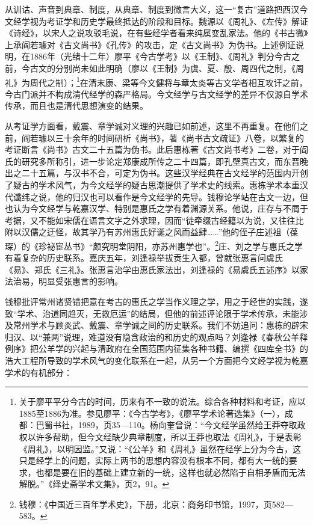\documentclass[a4paper, 12pt, openright]{ctexbook}
\begin{document}
从训诂、声音到典章、制度，从典章、制度到微言大义，这一“复古”道路把西汉今文经学视为考证学和历史学最终抵达的阶段和目标。魏源以《周礼》、《左传》解证《诗经》，以宋人之说攻驳毛说，在有些经学者看来纯属变乱家法。他的《书古微》上承阎若璩对《古文尚书》《孔传》的攻击，定《古文尚书》为伪书。上述例证说明，在1886年（光绪十二年）廖平《今古学考》以《王制》、《周礼》判分今古之前，今古文的分别尚未如此明确（廖以《王制》为虞、夏、殷、周四代之制，《周礼》为周代之制）；\footnote{关于廖平平分今古的时间，历来有不一致的说法。综合各种材料和考证，应以1885至1886为准。参见廖平：《今古学考》，《廖平学术论著选集》（一），成都：巴蜀书社，1989，页35—110。杨向奎曾说：“今文经学虽然给王莽夺取政权以许多帮助，但今文经缺少典章制度，所以王莽也取法《周礼》，于是表彰《周礼》，以明因监。”又说：“《公羊》和《周礼》虽然在经学上分为今古，这只是经学上的问题，实际上两书的思想内容没有根本不同，都有大一统的要求，也都是要在旧的基础上建立新的一统，这样也就必然陷于自相矛盾而无法解脱。”《绎史斋学术文集》，页2，91。}在清末康、梁等今文健将与章太炎等古文学者相互攻讦之前，今古门派并不构成清代经学的森严格局。今文经学与古文经学的差异不仅源自学术传承，而且也是清代思想演变的结果。

从考证学方面看，戴震、章学诚对义理的兴趣已如前述，这里不再重复。在他们之前，阎若璩以三十余年的时间研析《尚书》，著《尚书古文疏证》八卷，以繁复的考证断言《尚书》古文二十五篇为伪书。此后惠栋著《古文尚书考》二卷，对于阎氏的研究多所称引，进一步论定郑康成所传之二十四篇，即孔壁真古文，而东晋晚出之二十五篇，与汉书不合，可定为伪书。这些汉学经典在古文经学的范围内开创了疑古的学术风气，为今文经学的疑古思潮提供了学术史的线索。惠栋学术本重汉代谶纬之说，他的归汉也可以看作是今文经学的先导。钱穆论学站在古文一边，但也认为今文经学与乾嘉汉学、特别是惠氏之学有着渊源关系。他说，庄存与不屑于考据，又不能如宋儒在语言文字之外求理，因而“徒牵缀古经籍以为说，又往往比附以汉儒之迂怪，故其学乃有苏州惠氏好诞之风而益肆……”他的侄子庄述祖（葆琛）的《珍袐宦丛书》“颇究明堂阴阳，亦苏州惠学也”。\footnote{钱穆：《中国近三百年学术史》，下册，北京：商务印书馆，1997，页582—583。}庄、刘之学与惠氏之学有着复杂的历史联系。嘉庆五年，刘逢禄举拔贡生入都，曾就张惠言问虞氏《易》、郑氏《三礼》。张惠言治学由惠氏家法出，刘逢禄的《易虞氏五述序》以家法治易，明显受张惠言的影响。

钱穆批评常州诸贤错把意在考古的惠氏之学当作义理之学，用之于经世的实践，遂致“学术、治道同趋灭，无救厄运”的结局，但他的前述评论限于学术传承，未能涉及常州学术与顾炎武、戴震、章学诚之间的历史联系。我们不妨追问：惠栋的辟宋归汉、以“兼两”说理，难道没有隐含政治的和历史的观点吗？刘逢禄《春秋公羊释例序》把公羊学的兴起与清政府在全国范围内征集各种书籍、编撰《四库全书》的浩大工程所导致的学术风气的变化联系在一起，从另一个方面把今文经学视为乾嘉学术的有机部分：
\end{document}
